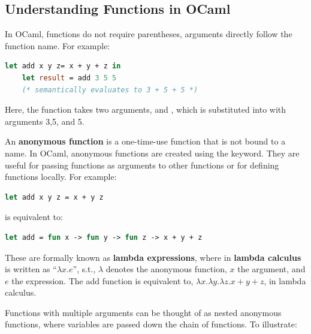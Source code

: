 \subsection{Understanding Functions in OCaml}
\label{subsec:func-ocaml}
In OCaml, functions do not require parentheses, arguments directly follow the function name. 
For example:
\begin{lstlisting}[language=OCaml]
    let add x y z= x + y + z in 
    let result = add 3 5 5
    (* semantically evaluates to 3 + 5 + 5 *)
\end{lstlisting}

\noindent
Here, the  function takes two arguments,  and , which is substituted into  with arguments 3,5, and 5.\\

\begin{Def}

An \textbf{anonymous function} is a one-time-use function that is not bound to a name. In OCaml, anonymous functions are created using the  keyword.
They are useful for passing functions as arguments to other functions or for defining functions locally. For example:

\begin{lstlisting}[language=OCaml, numbers=none]
    let add x y z = x + y z
\end{lstlisting}
\noindent is equivalent to:
\begin{lstlisting}[language=OCaml, numbers=none]
    let add = fun x -> fun y -> fun z -> x + y + z
\end{lstlisting}

\noindent
These are formally known as \textbf{lambda expressions}, where in \textbf{lambda calculus}  is written 
as ``$\lambda x.e$'', s.t., $\lambda$ denotes the anonymous function, $x$ the argument, and $e$ the expression.
The add function is equivalent to, $\lambda x.\lambda y.\lambda z.x + y + z$, in lambda calculus.

\end{Def}

\newpage

\noindent
Functions with multiple arguments can be thought of as nested anonymous functions, where variables are passed 
down the chain of functions. To illustrate:

